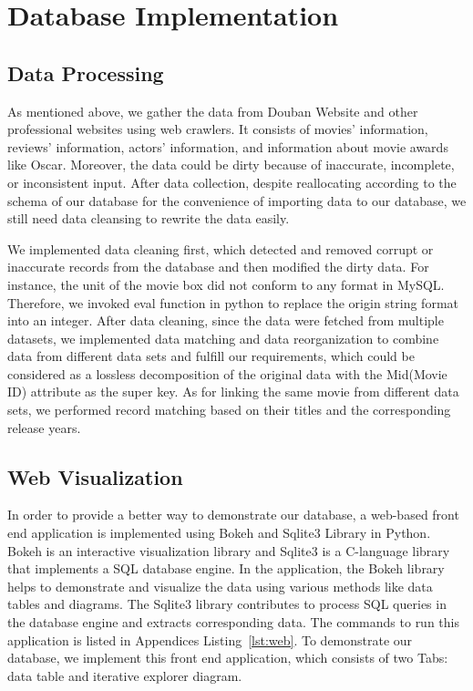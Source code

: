 \documentclass[a4paper]{article}
\begin{document}
\section{Database Implementation}
\subsection{Data Processing}
As mentioned above, we gather the data from Douban Website and other professional websites using web crawlers. It consists of movies' information, reviews' information, actors' information, and information about movie awards like Oscar. Moreover, the data could be dirty because of inaccurate, incomplete, or inconsistent input. After data collection, despite reallocating according to the schema of our database for the convenience of importing data to our database, we still need data cleansing to rewrite the data easily. \par
We implemented data cleaning first, which detected and removed corrupt or inaccurate records from the database and then modified the dirty data. For instance, the unit of the movie box did not conform to any format in MySQL. Therefore, we invoked eval\(\) function in python to replace the origin string format into an integer. After data cleaning, since the data were fetched from multiple datasets, we implemented data matching and data reorganization to combine data from different data sets and fulfill our requirements, which could be considered as a lossless decomposition of the original data with the Mid(Movie ID) attribute as the super key. As for linking the same movie from different data sets, we performed record matching based on their titles and the corresponding release years.

\subsection{Web Visualization}
In order to provide a better way to demonstrate our database, a web-based front end application is implemented using Bokeh and Sqlite3 Library in Python. Bokeh is an interactive visualization library and Sqlite3 is a C-language library that implements a SQL database engine. In the application, the Bokeh library helps to demonstrate and visualize the data using various methods like data tables and diagrams. The Sqlite3 library contributes to process SQL queries in the database engine and extracts corresponding data. The commands to run this application is listed in Appendices Listing~\ref{lst:web}. To demonstrate our database, we implement this front end application, which consists of two Tabs: data table and iterative explorer diagram. \par
\end{document}

